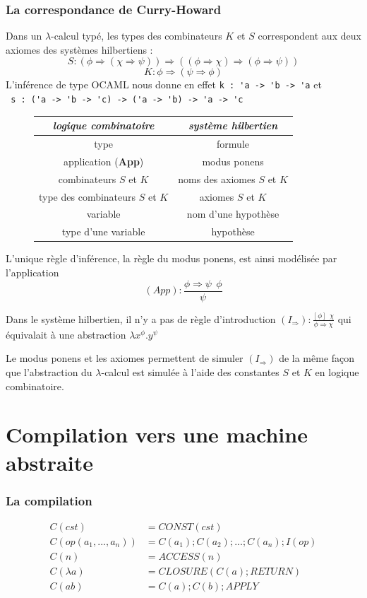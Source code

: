 \documentclass[11pt]{book}
\begin{document}
\subsubsection{La correspondance de Curry-Howard}
Dans un $\lambda$-calcul typé, les types des combinateurs $K$ et $S$ correspondent aux deux axiomes
des systèmes hilbertiens :
$$ S : (\phi \Rightarrow (\chi \Rightarrow \psi)) \Rightarrow ((\phi \Rightarrow \chi) \Rightarrow(\phi \Rightarrow \psi)) 
$$
$$   K : \phi \Rightarrow (\psi \Rightarrow \phi)
$$
L'inférence de type OCAML nous donne en effet 
\verb+k : 'a -> 'b -> 'a+ et  \\ 
\verb+ s : ('a -> 'b -> 'c) -> ('a -> 'b) -> 'a -> 'c+
\begin{center}
\begin{figure}[H]
	\begin{tabular}{|c|c|} \hline
		\textit{logique combinatoire} & \textit{système hilbertien} \\ \hline
		type & formule \\
		application (\textbf{App}) & modus ponens \\
		combinateurs $S$ et $K$ & noms des axiomes $S$ et $K$ \\
		type des combinateurs $S$ et $K$ & axiomes $S$ et $K$ \\
		variable & nom d'une hypothèse \\
		type d'une variable & hypothèse \\ \hline
	\end{tabular}	
\end{figure}
\end{center}

L'unique règle d'inférence, la règle du modus ponens, est ainsi modélisée par l'application
$$ (App) : \frac{\phi \Rightarrow \psi \ \ \phi}{\psi} $$

Dans le système hilbertien, il n'y a pas de règle d'introduction 
$(I_\Rightarrow) : \frac{[\phi]\ \ \chi}{\phi \Rightarrow \chi}$ qui équivalait à une abstraction 
$\lambda x^\phi.y^\psi $

Le modus ponens et les axiomes permettent de simuler $(I_\Rightarrow )$ de la même façon que 
l'abstraction du $\lambda$-calcul est simulée à l'aide des constantes $S$ et $K$ en logique combinatoire.

\section{Compilation vers une machine abstraite}
\subsubsection{La compilation}
\begin{align*}
  C(cst) &= CONST(cst) \\
  C(op(a_1, . . . , a_n)) &= C(a_1); C(a_2); . . . ; C(a_n); I(op) \\
  C(n) &= ACCESS(n) \\
  C(\lambda a) &= CLOSURE(C(a); RETURN) \\
  C(a b) &= C(a); C(b); APPLY 
\end{align*}
\end{document}
